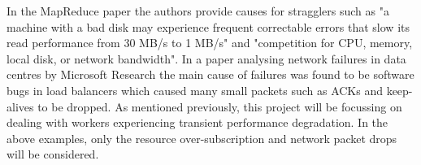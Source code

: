 \documentclass[12pt]{article}
\begin{document}
In the MapReduce paper \citep{dean2008mapreduce} the authors provide causes for stragglers such as "a machine with a bad disk may experience frequent correctable errors that slow its read performance from 30 MB/s to 1 MB/s" and "competition for CPU, memory, local disk, or network bandwidth". In a paper analysing network failures in data centres by Microsoft Research \citep{gill2011understanding} the main cause of failures was found to be software bugs in load balancers which caused many small packets such as ACKs and keep-alives to be dropped.
\newline
As mentioned previously, this project will be focussing on dealing with workers experiencing transient performance degradation. In the above examples, only the resource over-subscription and network packet drops will be considered. 

\newpage



\end{document}
